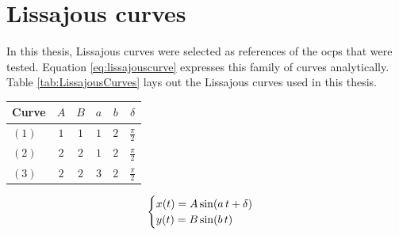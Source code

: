 \section{Lissajous curves}
\label{section:lissajouscurves}

In this thesis, Lissajous curves \cite{lawrence1972catalog} were selected as references of the \acrlong{ocp}s that were tested. Equation \ref{eq:lissajouscurve} expresses this family of curves analytically. Table \ref{tab:LissajousCurves} lays out the Lissajous curves used in this thesis.

\begin{center}
    \begin{minipage}{0.45\textwidth}
        \centering
        \begin{tabular}[]{lccccc}
			\toprule
				Curve & $A$ & $B$ & $a$ & $b$ & $\delta$ \\
			\midrule
				$(1)$ & $1$ & $1$ & $1$ & $2$ & $\frac{\pi}{2}$\\
				$(2)$ & $2$ & $2$ & $1$ & $2$ & $\frac{\pi}{2}$\\
				$(3)$ & $2$ & $2$ & $3$ & $2$ & $\frac{\pi}{2}$\\
  			\bottomrule
  		\end{tabular}
        \label{tab:LissajousCurves}
    \end{minipage}
    \hfill
    \begin{minipage}{0.45\textwidth}
        \centering
        \begin{equation}
        	\begin{cases}
				x(t) = A\sin(a\,t + \delta)\\
				y(t) = B \sin(b\,t)
			\end{cases}
			\label{eq:lissajouscurve}
        \end{equation}
    \end{minipage}
\end{center}
